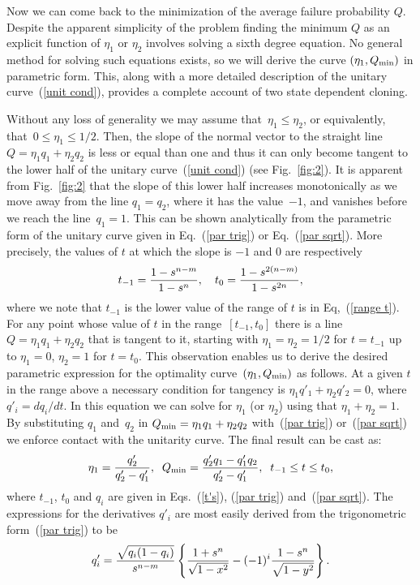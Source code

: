 \documentclass[aps,prl,twocolumn,showpacs]{revtex4}
\begin{document}
Now we can come back to the minimization of the average failure probability $Q$. Despite the apparent simplicity of the problem finding the minimum $Q$ as an explicit function of $\eta_1$ or $\eta_2$ involves solving a sixth degree equation. No general method for solving such equations exists, so  we will derive the curve $(\eta_1,Q_{\rm min})$ in parametric form. This, along with a more detailed description of the unitary curve~(\ref{unit cond}), provides a complete account of two state dependent cloning.

Without any loss of generality we may assume that~$\eta_1\le\eta_2$, or equivalently,  that~$0\le\eta_1\le 1/2$. Then, the slope of the normal vector to the straight line~$Q=\eta_1 q_1+\eta_2 q_2$ is less or equal than one and thus it can only become tangent to the lower half of the unitary curve~(\ref{unit cond}) (see Fig.~\ref{fig:2}). It is apparent from Fig.~\ref{fig:2} that the slope of this lower half increases monotonically as we move away from the line $q_1=q_2$, where it has the value~$-1$, and vanishes before we reach the line~$q_1=1$. This can be shown analytically from the parametric form of the unitary curve given in Eq.~(\ref{par trig}) or Eq.~(\ref{par sqrt}). More precisely, the values of $t$ at which the slope is $-1$ and $0$ are respectively
%
\begin{equation}
t_{-1}={1-s^{n-m}\over 1-s^n},\quad
t_0={1-s^{2(n-m)}\over 1-s^{2n}},
\label{t's}
\end{equation}
%
where we note that $t_{-1}$ is the lower value of the range of $t$ is in Eq,~(\ref{range t}). For any point whose value of $t$ in the range~$[t_{-1},t_0]$ there is a line $Q=\eta_1 q_1+\eta_2 q_2$ that is tangent to it, starting with $\eta_1=\eta_2=1/2$ for $t=t_{-1}$ up to $\eta_1=0$, $\eta_2=1$ for $t=t_0$. This observation enables us to derive the desired parametric expression for the optimality curve~$(\eta_1,Q_{\rm min})$ as follows. At a given $t$ in the range above a necessary condition for tangency is \mbox{$\eta_1 q'_1+\eta_2 q'_2=0$}, where $q'_i=d q_i/d t$. In this equation we can solve for $\eta_1$ (or $\eta_2$) using that $\eta_1+\eta_2=1$. By substituting $q_1$ and~$q_2$ in $Q_{\rm min}=\eta_1 q_1+\eta_2 q_2$ with~(\ref{par trig}) or~(\ref{par sqrt}) we enforce contact with the unitarity curve. The final result can be cast as:
%
\begin{equation}
\eta_1={q'_2\over q'_2-q'_1},\;\; Q_{\rm min}={q'_2 q_1-q'_1 q_2\over q'_2-q'_1},\;\; t_{-1}\le t\le t_0,
\end{equation}
%
where $t_{-1}$, $t_0$ and $q_i$ are given in Eqs.~(\ref{t's}), (\ref{par trig}) and~(\ref{par sqrt}). The expressions for the derivatives $q'_i$ are most easily derived from the trigonometric form~(\ref{par trig}) to be
%
\begin{equation}
q'_i={\sqrt{q_i(1-q_i)}\over s^{n-m}}\left\{{1+s^n\over\sqrt{1-x^2}}-(-1)^i{1-s^n\over\sqrt{1-y^2}}\right\}.
\end{equation}
%
\end{document}
